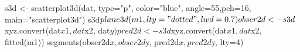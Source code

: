 \begin{Schunk}
\begin{Sinput}
 s3d <- scatterplot3d(dat, type="p", color="blue", angle=55,pch=16, main="scatterplot3d")
 s3d$plane3d(m1, lty= "dotted", lwd=0.7)
 obser2d <- s3d$xyz.convert(dat$x1, dat$x2, dat$y)
 pred2d <- s3d$xyz.convert(dat$x1, dat$x2, fitted(m1))
 segments(obser2d$x, obser2d$y, pred2d$x, pred2d$y, lty=4)
\end{Sinput}
\end{Schunk}

